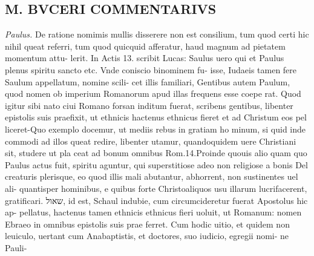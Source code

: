 \documentclass{article}
\begin{document}
\begin{pages}
\section*{M. BVCERI COMMENTARIVS }
\marginpar{[ p.17 ]}
\textit{Paulus. }\pstart De ratione nomimis mullis disserere non est consilium, tum quod certi hic nihil queat referri, tum quod quicquid afferatur, haud magnum ad pietatem momentum attu- lerit. In Actis 13. scribit Lucas: Saulus uero qui et Paulus plenus spiritu sancto etc. Vnde coniscio binominem fu- isse, Iudaeis tamen fere Saulum appellatum, nomine scili- cet illis familiari, Gentibus autem Paulum, quod nomen ob imperium Romanorum apud illas frequens esse coepe rat. Quod igitur sibi nato ciui Romano forsan inditum fuerat, scribens gentibus, libenter epistolis suis praefixit, ut ethnicis hactenus ethnicus fieret et ad Christum eos pel liceret-Quo exemplo docemur, ut mediis rebus in gratiam ho minum, si quid inde commodi ad illos queat redire, libenter utamur, quandoquidem uere Christiani sit, studere ut pla ceat ad bonum omnibus Rom.14.Proinde quouis alio quam quo Paulus actus fuit, spiritu aguntur, qui superstitiose adeo non religiose a bonis Del creaturis plerisque, eo quod illis mali abutantur, abhorrent, non sustinentes uel ali- quantisper hominibus, e quibus forte Christoaliquos usu illarum lucrifacerent, gratificari. שאול, id est, Schaul indubie, cum circumcideretur fuerat Apostolus hic ap- pellatus, hactenus tamen ethnicis ethnicus fieri uoluit, ut Romanum: nomen Ebraeo in omnibus epistolis suis prae ferret. Cum hodic uitio, et quidem non leuiculo, uertant cum Anabaptistis, et doctores, suo iudicio, egregii  \pendDe nomi- ne Pauli- 

\end{pages}
\end{document}
